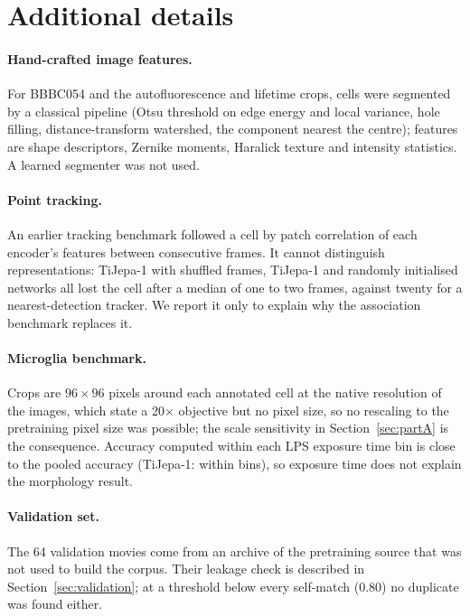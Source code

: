 \section{Additional details}
\label{app:details}

\paragraph{Hand-crafted image features.} For BBBC054 and the autofluorescence and lifetime
crops, cells were segmented by a classical pipeline (Otsu threshold on edge energy and local
variance, hole filling, distance-transform watershed, the component nearest the centre); features are shape descriptors, Zernike moments, Haralick texture and
intensity statistics. A learned segmenter was not used.

\paragraph{Point tracking.} An earlier tracking benchmark followed a cell by patch
correlation of each encoder's features between consecutive frames. It cannot distinguish
representations: TiJepa-1 with shuffled frames, TiJepa-1 and randomly initialised networks
all lost the cell after a median of one to two frames, against twenty for a nearest-detection
tracker. We report it only to explain why the association benchmark replaces it.

\paragraph{Microglia benchmark.} Crops are $96\times96$ pixels around each annotated cell at
the native resolution of the images, which state a 20$\times$ objective but no pixel size,
so no rescaling to the pretraining pixel size was possible; the scale sensitivity in
Section~\ref{sec:partA} is the consequence. Accuracy computed within each LPS exposure
time bin is close to the pooled accuracy (TiJepa-1:  within bins), so
exposure time does not explain the morphology result.

\paragraph{Validation set.} The 64 validation movies come from an archive of the
pretraining source that was not used to build the corpus. Their leakage check is described
in Section~\ref{sec:validation}; at a threshold below every self-match (0.80) no
duplicate was found either.

